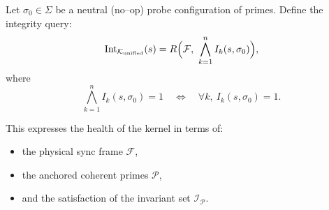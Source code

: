 \documentclass[12pt]{article}
\begin{document}
Let \(\sigma_0 \in \Sigma\) be a neutral (no--op) probe configuration of primes.  
Define the integrity query:
\[
\mathrm{Int}_{\mathcal{K}_{\text{unified}}}(s) =
R\Bigl(\mathcal{F},\ \bigwedge_{k=1}^{n} I_k(s,\sigma_0)\Bigr),
\]
where
\[
\bigwedge_{k=1}^{n} I_k(s,\sigma_0) = 1
\quad \Leftrightarrow \quad
\forall k,\ I_k(s,\sigma_0) = 1.
\]

This expresses the health of the kernel in terms of:
\begin{itemize}
  \item the physical sync frame \(\mathcal{F}\),
  \item the anchored coherent primes \(\mathcal{P}\),
  \item and the satisfaction of the invariant set \(\mathcal{I}_{\mathcal{P}}\).
\end{itemize}
\end{document}
